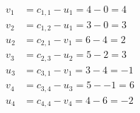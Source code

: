 \[
\begin{aligned}
v_{1} &= c_{1,1} - u_{1} = 4 - 0 = 4 \\
v_{2} &= c_{1,2} - u_{1} = 3 - 0 = 3 \\
u_{2} &= c_{2,1} - v_{1} = 6 - 4 = 2 \\
v_{3} &= c_{2,3} - u_{2} = 5 - 2 = 3 \\
u_{3} &= c_{3,1} - v_{1} = 3 - 4 = -1 \\
v_{4} &= c_{3,4} - u_{3} = 5 - -1 = 6 \\
u_{4} &= c_{4,4} - v_{4} = 4 - 6 = -2 \\
\end{aligned}
\]

